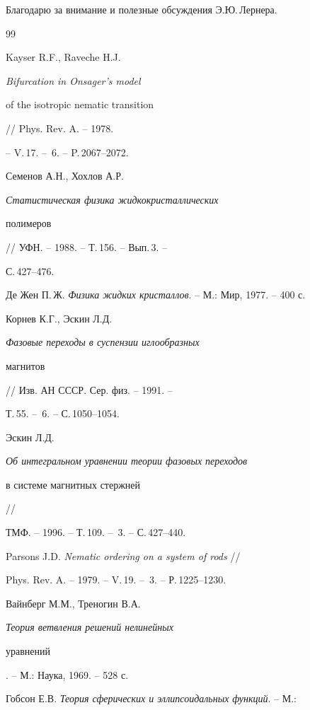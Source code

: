  


Благодарю за внимание и полезные обсуждения Э.Ю.\,Лернера.  


 


\begin{thebibliography}{99} 


 




Kayser R.F., Raveche H.J. {\em Bifurcation in Onsager's model 


of the isotropic nematic transition} // Phys. Rev. A. -- 1978. 


-- V.\,17. -- \No\,6. -- P.\,2067--2072. 




Семенов А.Н., Хохлов А.Р. {\em Статистическая физика жидкокристаллических 


полимеров} // УФН. -- 1988. -- Т.\,156. -- Вып.\,3. -- 


С.\,427--476. 




Де Жен П.\,Ж. {\em Физика жидких кристаллов}. -- М.: Мир, 1977. -- 400 с. 




Корнев К.Г., Эскин Л.Д. {\em Фазовые переходы в суспензии иглообразных 


магнитов} // Изв. АН СССР. Сер. физ. -- 1991. -- 


Т.\,55. -- \No\,6. -- С.\,1050--1054. 




Эскин Л.Д. {\em Об интегральном уравнении теории фазовых переходов 


в системе магнитных стержней} // 


ТМФ. -- 1996. -- Т.\,109. -- \No\,3. -- С.\,427--440. 




Parsons J.D. {\em Nematic ordering on a system of rods} // 


Phys. Rev. A. -- 1979. -- V.\,19. -- \No\,3. -- Р.\,1225--1230. 




Вайнберг М.М., Треногин В.А. {\em Теория ветвления решений нелинейных 


уравнений}. -- М.: Наука, 1969. -- 528 с. 




Гобсон Е.В. {\em Теория сферических и эллипсоидальных функций}. -- М.: 



\end{thebibliography}
